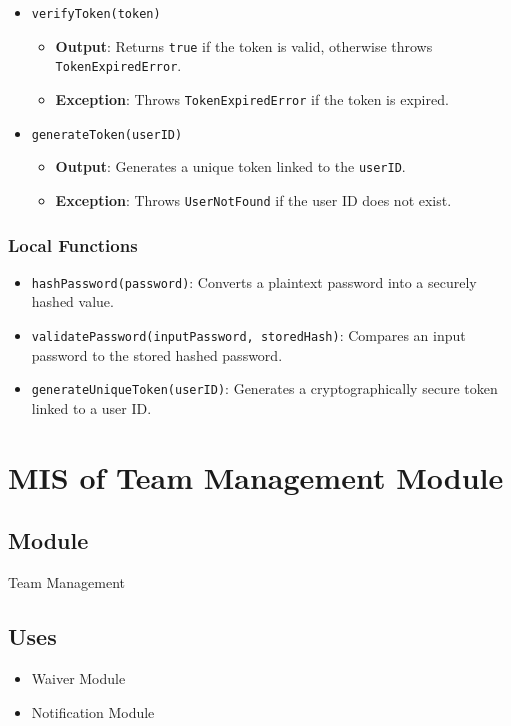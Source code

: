 \documentclass[12pt, titlepage]{article}
\begin{document}
\begin{itemize}
  \item \texttt{verifyToken(token)}
        \begin{itemize}
          \item \textbf{Output}: Returns \texttt{true} if the token is valid, otherwise throws \texttt{TokenExpiredError}.
          \item \textbf{Exception}: Throws \texttt{TokenExpiredError} if the token is expired.
        \end{itemize}

  \item \texttt{generateToken(userID)}
        \begin{itemize}
          \item \textbf{Output}: Generates a unique token linked to the \texttt{userID}.
          \item \textbf{Exception}: Throws \texttt{UserNotFound} if the user ID does not exist.
        \end{itemize}
\end{itemize}

\subsubsection{Local Functions}

\begin{itemize}
  \item \texttt{hashPassword(password)}: Converts a plaintext password into a securely hashed value.
  \item \texttt{validatePassword(inputPassword, storedHash)}: Compares an input password to the stored hashed password.
  \item \texttt{generateUniqueToken(userID)}: Generates a cryptographically secure token linked to a user ID.
\end{itemize}

\section{MIS of Team Management Module} \label{TeamManagementModule}

\subsection{Module}
Team Management

\subsection{Uses}
\begin{itemize}
  \item Waiver Module
  \item Notification Module
\end{itemize}
\end{document}
